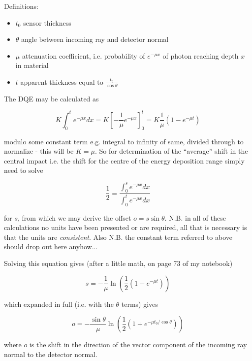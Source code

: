 \documentclass{article}
\begin{document}
\noindent
Definitions:
\begin{itemize}
\item{$t_0$ sensor thickness}
\item{$\theta$ angle between incoming ray and detector normal}
\item{$\mu$ attenuation coefficient, i.e. probability of $e^{-\mu x}$ of photon reaching depth $x$ in material}
\item{$t$ apparent thickness equal to $\frac{t_0}{\cos \theta}$}
\end{itemize}

\noindent
The DQE may be calculated as

\begin{equation}
K \int_0^t e^{-\mu x} dx = K \left[ - \frac{1}{\mu} e^{-\mu x} \right]_0^t = 
K \frac{1}{\mu} \left( 1 - e^{-\mu t} \right)
\end{equation}

\noindent
modulo some constant term e.g. integral to infinity of same, divided
through to normalize - this will be $K = \mu$.
So for determination of the ``average'' shift in the central impact i.e. the shift for the centre of the energy deposition range simply need to solve 

\begin{equation}
\frac{1}{2} = \frac{\int_0^s e^{-\mu x} dx}{\int_0^t e^{-\mu x} dx}
\end{equation}

\noindent
for $s$, from which we may derive the offset $o = s \sin
\theta$. N.B. in all of these calculations no units have been
presented or are required, all that is necessary is that the units are
\emph{consistent}. Also N.B. the constant term referred to above
should drop out here anyhow...

Solving this equation gives (after a little math, on page 73 of my notebook)

\begin{equation}
s = - \frac{1}{\mu} \ln \left( \frac{1}{2} \left( 1 + e^{-\mu t} \right) \right)
\end{equation}

\noindent
which expanded in full (i.e. with the $\theta$ terms) gives

\begin{equation}
o = - \frac{\sin \theta}{\mu} \ln \left( \frac{1}{2} \left( 1 + e^{-\mu t_0 / \cos \theta} \right) \right)
\end{equation}

\noindent
where $o$ is the shift in the direction of the vector component of the incoming ray normal to the detector normal.
\end{document}

